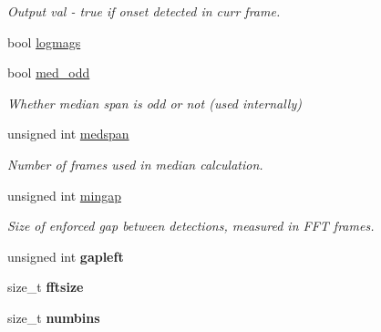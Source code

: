 \begin{DoxyCompactItemize}
\begin{DoxyCompactList}\small\item\em \-Output val -\/ true if onset detected in curr frame. \end{DoxyCompactList}\item 
bool \hyperlink{structOnsetsDS_a9570cf2143c45ca1651ebbe81f21199e}{logmags}
\item 
\hypertarget{structOnsetsDS_a926db7204c2e92f502f5b0c4d2deb0a2}{bool \hyperlink{structOnsetsDS_a926db7204c2e92f502f5b0c4d2deb0a2}{med\-\_\-odd}}\label{structOnsetsDS_a926db7204c2e92f502f5b0c4d2deb0a2}

\begin{DoxyCompactList}\small\item\em \-Whether median span is odd or not (used internally) \end{DoxyCompactList}\item 
\hypertarget{structOnsetsDS_a1b0ed838be9b25e8b45e3552b80da3ee}{unsigned int \hyperlink{structOnsetsDS_a1b0ed838be9b25e8b45e3552b80da3ee}{medspan}}\label{structOnsetsDS_a1b0ed838be9b25e8b45e3552b80da3ee}

\begin{DoxyCompactList}\small\item\em \-Number of frames used in median calculation. \end{DoxyCompactList}\item 
\hypertarget{structOnsetsDS_ac90cd3d9453c1daec926ddd2e96e9f91}{unsigned int \hyperlink{structOnsetsDS_ac90cd3d9453c1daec926ddd2e96e9f91}{mingap}}\label{structOnsetsDS_ac90cd3d9453c1daec926ddd2e96e9f91}

\begin{DoxyCompactList}\small\item\em \-Size of enforced gap between detections, measured in \-F\-F\-T frames. \end{DoxyCompactList}\item 
\hypertarget{structOnsetsDS_af5a60a5474a4bce7eafb563b7cd02783}{unsigned int {\bfseries gapleft}}\label{structOnsetsDS_af5a60a5474a4bce7eafb563b7cd02783}

\item 
\hypertarget{structOnsetsDS_aa6792213af79462ed2480bb9a0415812}{size\-\_\-t {\bfseries fftsize}}\label{structOnsetsDS_aa6792213af79462ed2480bb9a0415812}

\item 
\hypertarget{structOnsetsDS_a1794e50d716ffbae60b1f7a653b9fb35}{size\-\_\-t {\bfseries numbins}}\label{structOnsetsDS_a1794e50d716ffbae60b1f7a653b9fb35}

\end{DoxyCompactItemize}


